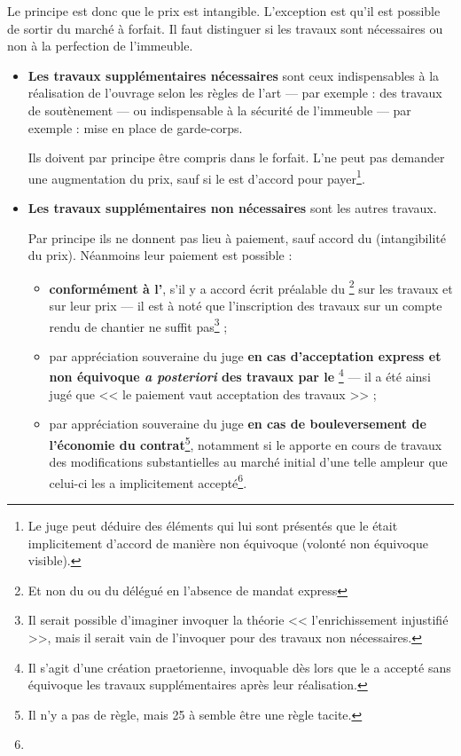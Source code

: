 					\bigskip Le principe est donc que le prix est intangible. L'exception est qu'il est possible de sortir du marché à forfait. Il faut distinguer si les travaux sont nécessaires ou non à la perfection de l'immeuble.
					\begin{itemize}
						\item \textbf{Les travaux supplémentaires nécessaires} sont ceux indispensables à la réalisation de l'ouvrage selon les règles de l'art --- par exemple : des travaux de soutènement --- ou indispensable à la sécurité de l'immeuble --- par exemple : mise en place de garde-corps.
						
						Ils doivent par principe être compris dans le forfait. L'\E ne peut pas demander une augmentation du prix, sauf si le \Mo est d'accord pour payer\footnote{Le juge peut déduire des éléments qui lui sont présentés que le \Mo était implicitement d'accord de manière non équivoque (volonté non équivoque visible).}.
						
						\item \textbf{Les travaux supplémentaires non nécessaires} sont les autres travaux.
						
						Par principe ils ne donnent pas lieu à paiement, sauf accord du \Mo (intangibilité du prix). Néanmoins leur paiement est possible :
						\begin{itemize}
							\item \textbf{conformément à l'}, s'il y a accord écrit préalable du \Mo\footnote{Et non du \Moe ou du \Mo délégué en l'absence de mandat express} sur les travaux et sur leur prix --- il est à noté que l'inscription des travaux sur un compte rendu de chantier ne suffit pas\footnote{Il serait possible d'imaginer invoquer la théorie << l'enrichissement injustifié >>, mais il serait vain de l'invoquer pour des travaux non nécessaires.} ;
							
							\item par appréciation souveraine du juge \textbf{en cas d'acceptation express et non équivoque \emph{a posteriori} des travaux par le \Mo}\footnote{Il s'agit d'une création praetorienne, invoquable dès lors que le \Mo a accepté sans équivoque les travaux supplémentaires après leur réalisation.} --- il a été ainsi jugé que << le paiement \lips vaut acceptation des travaux >> ;
							
							\item par appréciation souveraine du juge \textbf{en cas de bouleversement de l'économie du contrat}\footnote{Il n'y a pas de règle, mais 25 à  semble être une règle tacite.}, notamment si le \Mo apporte en cours de travaux des modifications substantielles au marché initial d'une telle ampleur que celui-ci les a implicitement accepté\footnote{}.
						\end{itemize}
					\end{itemize} 
				
